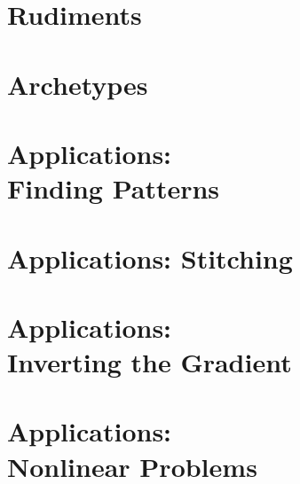 \documentclass[10pt]{newsiambook}
\begin{document}
\frontmatter
%
\tableofcontents
%
\listoffigures
\listoftables
%
%
%



\mainmatter
\part{Rudiments}



\part{Archetypes}






\part{Applications:\\Finding Patterns}



\part{Applications: Stitching}


\part{Applications:\\Inverting the Gradient}


\part{Applications:\\Nonlinear Problems}


\end{document}
